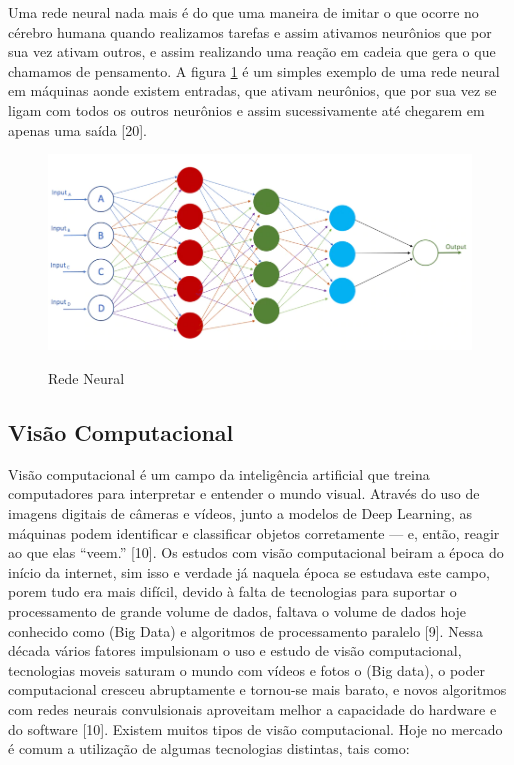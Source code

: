 Uma rede neural nada mais é do que uma maneira de imitar o que ocorre no cérebro humana quando realizamos tarefas e assim ativamos neurônios que por sua vez ativam outros, e assim realizando uma reação em cadeia que gera o que chamamos de pensamento. A figura \ref{fig:neural} é um simples exemplo de uma rede neural em máquinas aonde existem entradas, que ativam neurônios, que por sua vez se ligam com todos os outros neurônios e assim sucessivamente até chegarem em apenas uma saída [20].

\begin{figure}[htpb]
  \centering
  \caption{Rede Neural}
  \includegraphics[scale=.5]{figs/neural.png}
  \label{fig:neural}
\end{figure}
\subsection{Visão Computacional}
Visão computacional é um campo da inteligência artificial que treina computadores para interpretar e entender o mundo visual. Através do uso de imagens digitais de câmeras e vídeos, junto a modelos de Deep Learning, as máquinas podem identificar e classificar objetos corretamente — e, então, reagir ao que elas “veem.” [10].
Os estudos com visão computacional beiram a época do início da internet, sim isso e verdade já naquela época se estudava este campo, porem tudo era mais difícil, devido à falta de tecnologias para suportar o processamento de grande volume de dados, faltava o volume de dados hoje conhecido como (Big Data) e algoritmos de processamento paralelo [9]. Nessa década vários fatores impulsionam o uso e estudo de visão computacional, tecnologias moveis saturam o mundo com vídeos e fotos o (Big data), o poder computacional cresceu abruptamente e tornou-se mais barato, e novos algoritmos com redes neurais convulsionais aproveitam melhor a capacidade do hardware e do software [10].
 Existem muitos tipos de visão computacional. Hoje no mercado é comum a utilização de algumas tecnologias distintas, tais como:

